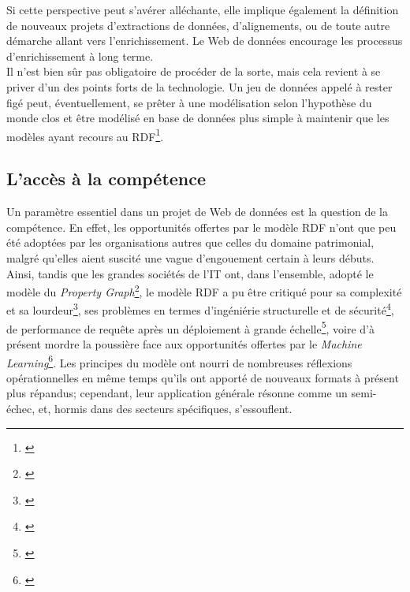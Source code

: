 \documentclass[a4paper,12pt,twoside]{book}
\begin{document}
Si cette perspective peut s'avérer alléchante, elle implique également la définition de nouveaux projets d'extractions de données, d'alignements, ou de toute autre démarche allant vers l'enrichissement. Le Web de données encourage les processus d'enrichissement à long terme.\\

Il n'est bien sûr pas obligatoire de procéder de la sorte, mais cela revient à se priver d'un des points forts de la technologie. Un jeu de données appelé à rester figé peut, éventuellement, se prêter à une modélisation selon l'hypothèse du \og monde clos \fg{} et être modélisé en base de données plus simple à maintenir que les modèles ayant recours au RDF\footnote{\cite{bohnkeVousModelisezMonde2019}}. 
 



\subsection{L'accès à la compétence}\label{3-competence}

Un paramètre essentiel dans un projet de Web de données est la question de la compétence. En effet, les opportunités offertes par le modèle RDF n'ont que peu été adoptées par les organisations autres que celles du domaine patrimonial, malgré qu'elles aient suscité une vague d'engouement certain à leurs débuts.\\

Ainsi, tandis que les grandes sociétés de l'IT ont, dans l'ensemble, adopté le modèle du \textit{Property Graph}\footnote{\cite{poupeauBilan15Ans2016}}, le modèle RDF a pu être critiqué pour sa complexité et sa lourdeur\footnote{\cite{cagleWhySemanticWeb2016}}, ses problèmes en termes d'ingéniérie structurelle et de sécurité\footnote{\cite{targetWhateverHappenedSemantic}}, de performance de requête après un déploiement à grande échelle\footnote{\cite{poupeauTechnologiesWebSemantique2018}}, voire d'à présent \og mordre la poussière \fg{} face aux opportunités offertes par le \textit{Machine Learning}\footnote{\cite{cabedaSemanticWebDead2017}}. Les principes du modèle ont nourri de nombreuses réflexions opérationnelles en même temps qu'ils ont apporté de nouveaux formats à présent plus répandus; cependant, leur application générale résonne comme un semi-échec, et, hormis dans des secteurs spécifiques, s'essouflent.\\
\end{document}
